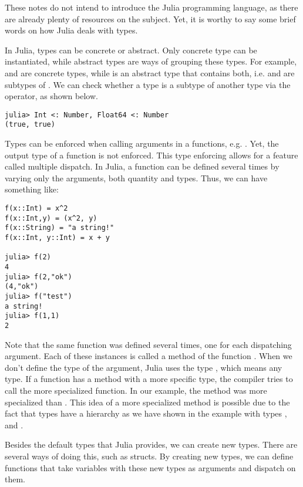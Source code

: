 These notes do not intend to introduce the Julia programming language, as there are
already plenty of resources on the subject. Yet, it is worthy to say some brief words on how
Julia deals with types.

In Julia, types can be concrete or abstract. Only concrete type can be instantiated, while abstract
types are ways of grouping these types. For example,  and  are concrete types, while
 is an abstract type that contains both, i.e.  and  are subtypes of .
We can check whether a type is a subtype of another type via the \pc{<:} operator, as shown below.
\bigskip
\begin{lstlisting}[language=JuliaLocal, style=julia, texcl=true]
julia> Int <: Number, Float64 <: Number
(true, true)
\end{lstlisting}

Types can be enforced when calling arguments in a functions, e.g.
. Yet, the output type of a function is not enforced.
This type enforcing allows for a feature called multiple dispatch. In Julia,
a function can be defined several times by varying only the arguments, both
quantity and types. Thus, we can have something like:

\begin{lstlisting}[language=JuliaLocal, style=julia, texcl=true]
f(x::Int) = x^2
f(x::Int,y) = (x^2, y)
f(x::String) = "a string!"
f(x::Int, y::Int) = x + y

julia> f(2)
4
julia> f(2,"ok")
(4,"ok")
julia> f("test")
a string!
julia> f(1,1)
2
\end{lstlisting}

Note that the same function  was defined several times, one for each
dispatching argument. Each of these instances is called a method of the function .
When we don't define the type of the argument,
Julia uses the type , which means any type.
If a function has a method with a more specific type, the compiler tries to
call the more specialized function. In our example, the method 
was more specialized than . This idea of a more specialized method
is possible due to the fact that types have a hierarchy as we have shown in the
example with types ,  and .

Besides the default types that Julia provides, we can create new types.
There are several ways of doing this, such as structs. By creating new types,
we can define functions that take variables with these new types as arguments
and dispatch on them.

